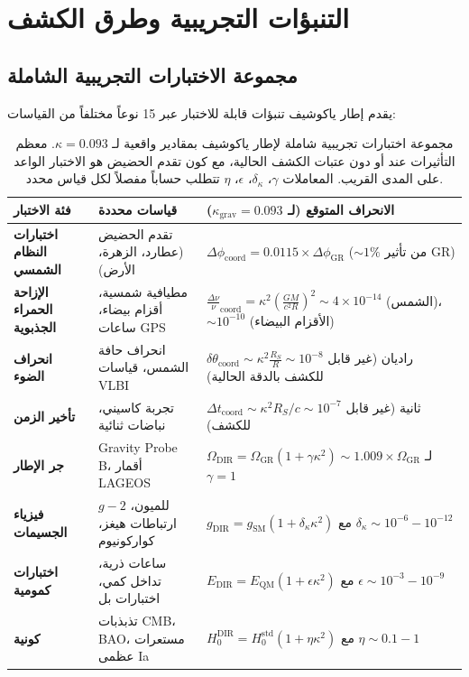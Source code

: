 \documentclass[11pt,a4paper]{article}
\begin{document}
	\section{التنبؤات التجريبية وطرق الكشف}
	\subsection{مجموعة الاختبارات التجريبية الشاملة}
	يقدم إطار ياكوشيف تنبؤات قابلة للاختبار عبر 15 نوعاً مختلفاً من القياسات:
	
	\begin{table}[htbp]
		\centering
		\scriptsize
		\begin{english}
			\begin{tabular}{p{}p{0.35\textwidth}p{}}
				\toprule
				\textbf{فئة الاختبار} & \textbf{قياسات محددة} & \textbf{الانحراف المتوقع (لـ $\kappa_{\text{grav}} = 0.093$)} \\
				\midrule
				\textbf{اختبارات النظام الشمسي} & 
				تقدم الحضيض (عطارد، الزهرة، الأرض) &
				$\Delta\phi_{\text{coord}} = 0.0115 \times \Delta\phi_{\text{GR}}$ ($\sim 1\%$ من تأثير GR) \\
				\hline
				\textbf{الإزاحة الحمراء الجذبوية} &
				مطيافية شمسية، أقزام بيضاء، ساعات GPS &
				$\frac{\Delta\nu}{\nu}_{\text{coord}} = \kappa^2\left(\frac{GM}{c^2R}\right)^2 \sim 4\times10^{-14}$ (الشمس)، $\sim 10^{-10}$ (الأقزام البيضاء) \\
				\hline
				\textbf{انحراف الضوء} &
				انحراف حافة الشمس، قياسات VLBI &
				$\delta\theta_{\text{coord}} \sim \kappa^2 \frac{R_S}{R} \sim 10^{-8}$ راديان (غير قابل للكشف بالدقة الحالية) \\
				\hline
				\textbf{تأخير الزمن} &
				تجربة كاسيني، نباضات ثنائية &
				$\Delta t_{\text{coord}} \sim \kappa^2 R_S/c \sim 10^{-7}$ ثانية (غير قابل للكشف) \\
				\hline
				\textbf{جر الإطار} &
				Gravity Probe B، أقمار LAGEOS &
				$\Omega_{\text{DIR}} = \Omega_{\text{GR}} (1 + \gamma \kappa^2) \sim 1.009 \times \Omega_{\text{GR}}$ لـ $\gamma=1$ \\
				\hline
				\textbf{فيزياء الجسيمات} &
				$g-2$ للميون، ارتباطات هيغز، كواركونيوم &
				$g_{\text{DIR}} = g_{\text{SM}} (1 + \delta_\kappa \kappa^2)$ مع $\delta_\kappa \sim 10^{-6} - 10^{-12}$ \\
				\hline
				\textbf{اختبارات كمومية} &
				ساعات ذرية، تداخل كمي، اختبارات بل &
				$E_{\text{DIR}} = E_{\text{QM}} (1 + \epsilon \kappa^2)$ مع $\epsilon \sim 10^{-3} - 10^{-9}$ \\
				\hline
				\textbf{كونية} &
				تذبذبات CMB، BAO، مستعرات عظمى Ia &
				$H_0^{\text{DIR}} = H_0^{\text{std}} (1 + \eta \kappa^2)$ مع $\eta \sim 0.1 - 1$ \\
				\bottomrule
			\end{tabular}
		\end{english}
		\caption{مجموعة اختبارات تجريبية شاملة لإطار ياكوشيف بمقادير واقعية لـ $\kappa = 0.093$. معظم التأثيرات عند أو دون عتبات الكشف الحالية، مع كون تقدم الحضيض هو الاختبار الواعد على المدى القريب. المعاملات $\gamma$، $\delta_\kappa$، $\epsilon$، $\eta$ تتطلب حساباً مفصلاً لكل قياس محدد.}
	\end{table}
	
\end{document}
